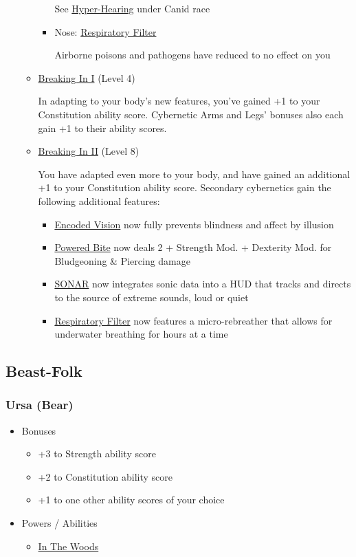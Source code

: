 \documentclass[12pt, landscape]{article}
\begin{document}
\begin{FlushLeft}
\begin{multicols}{2}
\begin{itemize}
\begin{itemize}
\begin{itemize}
						See \underline{Hyper-Hearing} under Canid race
						\item Nose: \underline{Respiratory Filter}

						Airborne poisons and pathogens have reduced to no effect on you
					\end{itemize}
					\item \underline{Breaking In I} (Level 4)

					In adapting to your body’s new features, you’ve gained +1 to your Constitution ability score. Cybernetic Arms and Legs' bonuses also each gain +1 to their ability scores.

					\item \underline{Breaking In II} (Level 8)

					You have adapted even more to your body, and have gained an additional +1 to your Constitution ability score. Secondary cybernetics gain the following additional features:
					\begin{itemize}
						\item \underline{Encoded Vision} now fully prevents blindness and affect by illusion
						\item \underline{Powered Bite} now deals 2 + Strength Mod. + Dexterity Mod. for Bludgeoning \& Piercing damage
						\item \underline{SONAR} now integrates sonic data into a HUD that tracks and directs to the source of extreme sounds, loud or quiet
						\item \underline{Respiratory Filter} now features a micro-rebreather that allows for underwater breathing for hours at a time
					\end{itemize}
				\end{itemize}
			\end{itemize}
			\vfill \pagebreak

			\subsection{Beast-Folk}
			\subsubsection{Ursa (Bear)}
			\begin{itemize}
				\item Bonuses
				\begin{itemize}
					\item +3 to Strength ability score
					\item +2 to Constitution ability score
					\item +1 to one other ability scores of your choice
				\end{itemize}
				\item Powers / Abilities
				\begin{itemize}
					\item \underline{In The Woods}


\end{itemize}
\end{itemize}
\end{multicols}
\end{FlushLeft}
\end{document}
